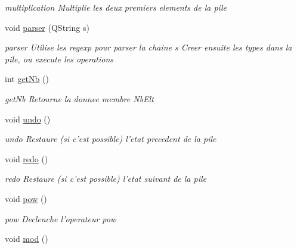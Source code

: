 \begin{DoxyCompactItemize}
\begin{DoxyCompactList}\small\item\em multiplication Multiplie les deux premiers elements de la pile \end{DoxyCompactList}\item 
void \hyperlink{class_pile_ac0be84cde5594e29678125e600bd8898}{parser} (Q\-String s)
\begin{DoxyCompactList}\small\item\em parser Utilise les regexp pour parser la chaine s Creer ensuite les types dans la pile, ou execute les operations \end{DoxyCompactList}\item 
int \hyperlink{class_pile_acc36fadfcc65c9863a9d1d8d5dbe859a}{get\-Nb} ()
\begin{DoxyCompactList}\small\item\em get\-Nb Retourne la donnee membre Nb\-Elt \end{DoxyCompactList}\item 
\hypertarget{class_pile_af91a4b277236024aa5aab9ef410881bb}{void \hyperlink{class_pile_af91a4b277236024aa5aab9ef410881bb}{undo} ()}\label{class_pile_af91a4b277236024aa5aab9ef410881bb}

\begin{DoxyCompactList}\small\item\em undo Restaure (si c'est possible) l'etat precedent de la pile \end{DoxyCompactList}\item 
\hypertarget{class_pile_aa8319a2921d86236d135cff700a5f833}{void \hyperlink{class_pile_aa8319a2921d86236d135cff700a5f833}{redo} ()}\label{class_pile_aa8319a2921d86236d135cff700a5f833}

\begin{DoxyCompactList}\small\item\em redo Restaure (si c'est possible) l'etat suivant de la pile \end{DoxyCompactList}\item 
\hypertarget{class_pile_a20b1ece0cc61ecefc78e1a785ad8235f}{void \hyperlink{class_pile_a20b1ece0cc61ecefc78e1a785ad8235f}{pow} ()}\label{class_pile_a20b1ece0cc61ecefc78e1a785ad8235f}

\begin{DoxyCompactList}\small\item\em pow Declenche l'operateur pow \end{DoxyCompactList}\item 
\hypertarget{class_pile_a6d6092af4859ea5cefaa7959bb208774}{void \hyperlink{class_pile_a6d6092af4859ea5cefaa7959bb208774}{mod} ()}\label{class_pile_a6d6092af4859ea5cefaa7959bb208774}


\end{DoxyCompactItemize}
